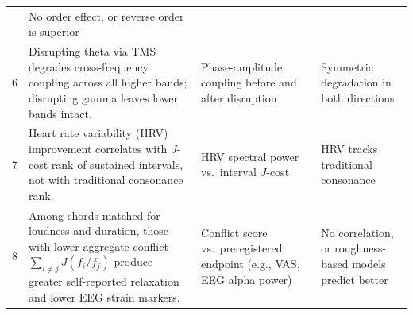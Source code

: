 \documentclass[11pt,a4paper]{article}
\begin{document}
\begin{table}[H]
\begin{tabular}{@{}c>{\raggedright\arraybackslash}p{5.2cm}>{\raggedright\arraybackslash}p{3.2cm}>{\raggedright\arraybackslash}p{3.5cm}@{}}
  & No order effect, or reverse order is superior \\[6pt]
6 & Disrupting theta via TMS degrades cross-frequency coupling
    across all higher bands; disrupting gamma leaves lower bands
    intact.
  & Phase-amplitude coupling before and after disruption
  & Symmetric degradation in both directions \\[6pt]
7 & Heart rate variability (HRV) improvement correlates with
    $J$-cost rank of sustained intervals, not with traditional
    consonance rank.
  & HRV spectral power vs.\ interval $J$-cost
  & HRV tracks traditional consonance \\[6pt]
8 & Among chords matched for loudness and duration, those with
    lower aggregate conflict $\sum_{i \neq j} J(f_i/f_j)$ produce greater
    self-reported relaxation and lower EEG strain markers.
  & Conflict score vs.\ preregistered endpoint (e.g., VAS, EEG alpha power)
  & No correlation, or roughness-based models predict better \\
\bottomrule
\end{tabular}
\end{table}
\end{document}
